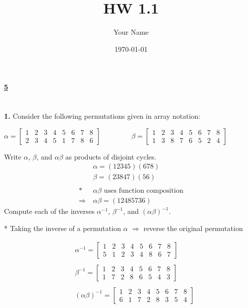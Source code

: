 \documentclass[12pt, letterpaper]{article}
\title{HW 1.1}
\author{Your Name}
\date{\today}
\begin{document}
 
\paragraph{\underline{5} \\ \\}
\textbf{1.} Consider the following permutations given in array notation:
\begin{center}
    $\alpha = \begin{bmatrix}
        1& 2 & 3 & 4 & 5 & 6 & 7 & 8  \\
        2 & 3 & 4 & 5 & 1 & 7 & 8 & 6
    \end{bmatrix}$ \ \ \ \ \  \ \ \
    $\beta = \begin{bmatrix}
        1 & 2 & 3 & 4 & 5 & 6 & 7 & 8 \\
        1 & 3 &8 & 7 & 6 & 5 & 2 & 4
    \end{bmatrix}$
\end{center} 
\vspace{1em}
\qquad {} Write $\alpha$, $\beta$, and $\alpha\beta$ as products of disjoint cycles.
\begin{align*}
        &\boxed{\alpha = (12345)(678)} \\  
        &\boxed{\beta = (23847)(56)} \\ \\
        * &\text{$\alpha\beta$ uses function composition} \\
        \Rightarrow \ &\boxed{\alpha\beta = (12485736)}
\end{align*}
\qquad {} Compute each of the inverses $\alpha^{-1}$, $\beta^{-1}$, and $(\alpha\beta)^{-1}$. \\ 
\begin{center}
     * Taking the inverse of a permutation $\alpha$ $\Rightarrow$ reverse the original permutation
\end{center}
\begin{align*}
     \ &\boxed{\alpha^{-1} = \begin{bmatrix}
        1 &  2 & 3 & 4 & 5 & 6 & 7 & 8 \\
        5 & 1 & 2 & 3 & 4 & 8 & 6 & 7
    \end{bmatrix}}  \\ \\
    &\boxed{\beta^{-1} = \begin{bmatrix}
        1 & 2 & 3 & 4 & 5 & 6 & 7 & 8 \\
        1 & 7 & 2 & 8 & 6 & 5 & 4 & 3
    \end{bmatrix}} \\ \\
    &\boxed{(\alpha\beta)^{-1} = \begin{bmatrix}
        1 & 2 & 3 & 4 & 5 & 6 & 7 & 8 \\
        6 & 1 & 7 & 2 & 8 & 3 & 5  & 4
    \end{bmatrix}} 
\end{align*}
\end{document}

